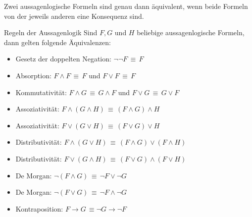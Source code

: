 \begin{remark}
    Zwei aussagenlogische Formeln sind genau dann äquivalent, wenn beide Formeln von der jeweils anderen eine Konsequenz sind.
\end{remark}

\begin{comment}
Wir können nun, ähnlich wie wir dies im ersten Kapitel informell für die Prädikatenlogik getan haben (als Konsequenz davon!), einige grundlegende logische Äquivalenzen nachweisen.
\end{comment}



\begin{lemma}{Regeln der Aussagenlogik}
    Sind $F,G$ und $H$ beliebige aussagenlogische Formeln, dann gelten folgende Äquivalenzen:
    \begin{itemize}
        \item Gesetz der doppelten Negation: $\neg\neg F\,\equiv\, F$
        \item Absorption: $F\land F\,\equiv\, F$ und $F\lor F\,\equiv\, F$
        \item Kommutativität: $F\land G\,\equiv\,G\land F$ und $F\lor G\,\equiv\, G\lor F$
        \item Assoziativität: $F\land(G\land H)\,\equiv\,(F\land G)\land H$
        \item Assoziativität: $F\lor(G\lor H)\,\equiv\,(F\lor G)\lor H$
        \item Distributivität: $F\land(G\lor H)\,\equiv\,(F\land G)\lor (F\land H)$
        \item Distributivität: $F\lor(G\land H)\,\equiv\,(F\lor G)\land (F\lor H)$
        \item De Morgan: $\neg (F\land G)\,\equiv\,\neg F\lor\neg G$
        \item De Morgan: $\neg (F\lor G)\,\equiv\,\neg F\land \neg G$
        \item Kontraposition: $F\to G\,\equiv\neg G\to\neg F$
    \end{itemize}
\end{lemma}

